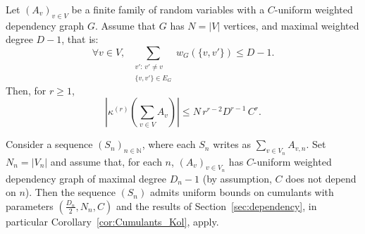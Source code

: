 \documentclass[envcountsame]{svmult}
\def\WDep{G}
\def\ka{\kappa}
\newcommand{\N}{\mathbb{N}}
\begin{document}
\begin{proposition}\label{Prop:BoundCumulantUWDG}
  Let $(A_v)_{v \in V}$ be a finite family of random variables
  with a $C$-uniform weighted dependency graph $\WDep$.
  Assume that $\WDep$ has $N=|V|$ vertices, and maximal weighted degree $D-1$, that is:
  $$\forall v \in V,\,\,\,\sum_{\substack{v':\,v' \ne v \\ \{v,v'\} \in E_G}} w_G(\{v,v'\}) \leq D-1.$$
  Then, for $r \ge 1$,
  \[ \left| \ka^{(r)}\left( \sum_{v \in V} A_v \right) \right|
  \le N\, r^{r-2} D^{r-1}\,C^r.\]
\end{proposition}
\noindent 
Consider a sequence $(S_n)_{n\in \N}$, where each $S_n$ writes as $\sum_{v \in V_n} A_{v,n}$.
Set $N_n=|V_n|$ and
assume that, for each $n$, $(A_v)_{v \in V_n}$ has $C$-uniform weighted dependency graph of maximal degree $D_n-1$
(by assumption, $C$ does not depend on $n$).
Then
the sequence $(S_n)$ admits uniform bounds on cumulants with parameters $(\tfrac{D_n}{2},N_n,C)$
and the results of Section~\ref{sec:dependency},
in particular Corollary~\ref{cor:Cumulants_Kol}, apply.
\end{document}
